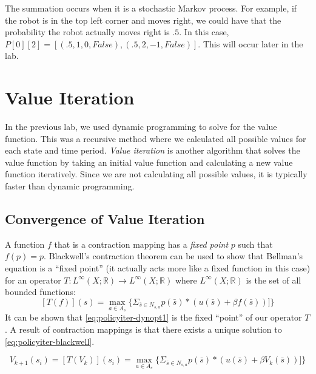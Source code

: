 The summation occurs when it is a stochastic Markov process.
For example, if the robot is in the top left corner and moves right, we could have that the probability the robot actually moves right is $.5$.
In this case, $P[0][2] = [(.5, 1, 0, False), (.5, 2, -1, False)]$.
This will occur later in the lab.

\section*{Value Iteration}

In the previous lab, we used dynamic programming to solve for the value function.
This was a recursive method where we calculated all possible values for each state and time period.
\emph{Value iteration} is another algorithm that solves the value function by taking an initial value function and calculating a new value function iteratively.
Since we are not calculating all possible values, it is typically faster than dynamic programming.

\subsection*{Convergence of Value Iteration}

A function $f$ that is a contraction mapping has a \emph{fixed point} $p$ such that $f(p) = p$.
Blackwell's contraction theorem can be used to show that Bellman's equation is a ``fixed point'' (it actually acts more like a fixed function in this case)
for an operator $T: L^{\infty}(X;\mathbb{R}) \to L^{\infty}(X;\mathbb{R})$ where $L^{\infty}(X;\mathbb{R})$ is the set of all bounded functions:
\begin{equation}
\label{eq:policyiter-blackwell}
[T(f)](s) = \max_{a \in A_s} \{\Sigma_{\bar{s}\in N_{s,a}} p(\bar{s}) * \left( u(\bar{s}) + \beta f(\bar{s})\right)]\}
\end{equation}
It can be shown that \ref{eq:policyiter-dynopt1} is the fixed ``point'' of our operator $T$.
A result of contraction mappings is that there exists a unique solution to \ref{eq:policyiter-blackwell}.


\begin{equation}
\label{eq:policyiter-val-iteration}
V_{k+1}(s_i) = [T(V_k)](s_i) = \max_{a \in A_s} \{\Sigma_{\bar{s}\in N_{s,a}}p(\bar{s}) *\left( u(\bar{s}) + \beta V_k(\bar{s})\right)]\}
\end{equation}

